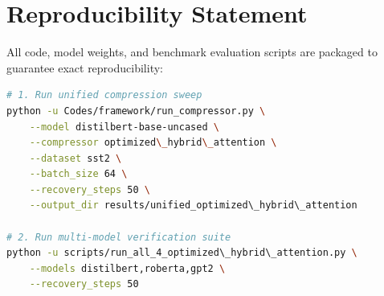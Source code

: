 \section{Reproducibility Statement}
All code, model weights, and benchmark evaluation scripts are packaged to guarantee exact reproducibility:
\begin{lstlisting}[language=bash]
# 1. Run unified compression sweep
python -u Codes/framework/run_compressor.py \
    --model distilbert-base-uncased \
    --compressor optimized\_hybrid\_attention \
    --dataset sst2 \
    --batch_size 64 \
    --recovery_steps 50 \
    --output_dir results/unified_optimized\_hybrid\_attention

# 2. Run multi-model verification suite
python -u scripts/run_all_4_optimized\_hybrid\_attention.py \
    --models distilbert,roberta,gpt2 \
    --recovery_steps 50
\end{lstlisting}

